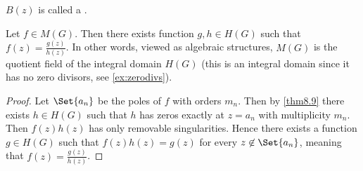 \begin{remark}
	$B(z)$ is called a .
\end{remark}

\begin{corollary}\label{cor8.10}
	Let $f \in M(G)$.
	Then there exists function $g, h \in H(G)$ such that $f(z) = \frac{g(z)}{h(z)}$.
	In other words, viewed as algebraic structures, $M(G)$ is the quotient field of the integral domain $H(G)$ (this is an integral domain since it has no zero divisors, see \autoref{ex:zerodivs}).
\end{corollary}

\begin{proof}
	Let $\Set{a_n}$ be the poles of $f$ with orders $m_n$.
	Then by \autoref{thm8.9} there exists $h \in H(G)$ such that $h$ has zeros exactly at $z = a_n$ with multiplicity $m_n$.
	Then $f(z) h(z)$ has only removable singularities.
	Hence there exists a function $g \in H(G)$ such that $f(z) h(z) = g(z)$ for every $z \not\in \Set{a_n}$, meaning that $f(z) = \frac{g(z)}{h(z)}$.
\end{proof}
